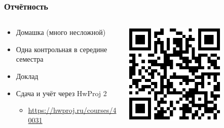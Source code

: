 \documentclass{../../slides-style}
\begin{document}
    \begin{frame}
        \frametitle{Отчётность}
        \begin{columns}
            \begin{column}{0.6\textwidth}
                \begin{itemize}
                    \item Домашка (много несложной)
                    \item Одна контрольная в середине семестра
                    \item Доклад
                    \item Сдача и учёт через HwProj 2
                    \begin{itemize}
                        \item \url{https://hwproj.ru/courses/40031}
                    \end{itemize}
                \end{itemize}
            \end{column}
            \begin{column}{0.4\textwidth}
                \begin{center}
                    \includegraphics[width=0.7\textwidth]{courseLink2025.png}
                \end{center}
            \end{column}
        \end{columns}
    \end{frame}
\end{document}
